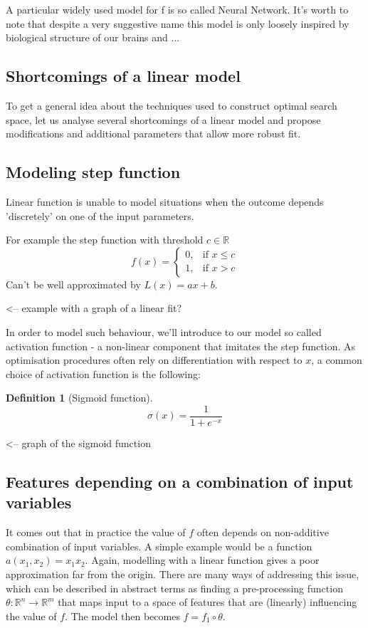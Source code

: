 \documentclass[a4paper]{article}
\theoremstyle{break}
\newtheorem{definition}{Definition}[section]
\newcommand{\R}{\mathbb{R}}
\begin{document}
A particular widely used model for f is so called Neural Network. It's worth to note that despite a very suggestive name this model is only loosely inspired by biological structure of our brains and ...

\subsection{Shortcomings of a linear model}
To get a general idea about the techniques used to construct optimal search space, let us analyse several shortcomings of a linear model and propose modifications and additional parameters that allow more robust fit.

\subsection{Modeling step function}
Linear function is unable to model situations when the outcome depends 'discretely' on one of the input parameters.

For example the step function with threshold $c \in \R$
$$ f(x) =
\begin{cases}
    0,& \text{if } x\leq c\\
    1,& \text{if } x > c
\end{cases}$$
Can't be well approximated by $L(x) = ax  + b$.

<-- example with a graph of a linear fit?

In order to model such behaviour, we'll introduce to our model so called activation function - a non-linear component  that imitates the step function. As optimisation procedures often rely on differentiation with respect to $x$, a common choice of activation function is the following:

\begin{definition}[Sigmoid function]
    $$ \sigma(x) = \frac{1}{1 + e^{-x}}$$
\end{definition}

<-- graph of the sigmoid function
 
\subsection{Features depending on a combination of input variables}
It comes out that in practice the value of $f$ often depends on non-additive combination of input variables. A simple example would be a function $a(x_1, x_2) = x_1 x_2$. Again, modelling with a linear function gives a poor approximation far from the origin.
There are many ways of addressing this issue, which can be described in abstract terms as finding a pre-processing function $ \theta : \R^n \to \R^m$ that maps input to a space of features that are (linearly) influencing the value of $f$. The model then becomes $ f = f_1 \circ \theta $.
\end{document}
